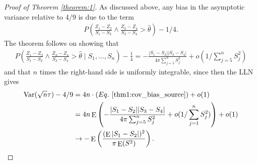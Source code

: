 \documentclass[12pt]{article}
\renewcommand{\P}{P}
\newcommand{\z}{Z}
\newcommand{\s}{S}
\newcommand{\thetahat}{\hat{\theta}}
\DeclareMathOperator{\E}{E}
\DeclareMathOperator{\V}{Var}
\DeclareMathOperator{\Cov}{Cov}
\newcommand{\comment}[1]{
  \iftoggle{commenttoggle}{
    {\normalsize{\color{red}{ #1}}\normalsize}
  }
  {}
}
\begin{document}
\begin{proof}[Proof of Theorem \ref{theorem:1}]
   As discussed above, any bias in the asymptotic variance relative to 4/9 is due to the term %
    \begin{align}
      \P\left(\frac{\z_1-\z_2}{\s_1-\s_2}\wedge \frac{\z_3-\z_4}{\s_3-\s_4}>\thetahat\right) - 1/4.
      \label{thm1:cov_bias_source}
    \end{align}
    The theorem follows on showing that %
    \begin{align}
      \P\left(\frac{\z_1-\z_2}{\s_1-\s_2}\wedge \frac{\z_3-\z_4}{\s_3-\s_4}>\thetahat\mid \s_1,\ldots,\s_n\right)-\frac{1}{4}
      = -\frac{|\s_1-\s_2||\s_3-\s_4|}{4\pi\sum_{j=5}^n \s_j^2} + o(1/\sum_{j=5}^n \s_j^2)
    \end{align}
    and that $n$ times the right-hand side is uniformly integrable, since then the LLN gives
    \begin{align}
      \begin{split}
      \V(\sqrt{n}\tau) - 4/9 &= 4n \cdot (Eq.\hspace{.05in} \eqref{thm1:cov_bias_source}) + o(1)\\
                               &= 4n\E\left( -\frac{|\s_1-\s_2||\s_3-\s_4|}{4\pi\sum_{j=5}^n \s_j^2} + o(1/\sum_{j=1}^n \s_j^2) \right) + o(1)\\
                               &\to -\E\left(\frac{(\E|\s_1-\s_2|)^2}{\pi\E(\s^2)}\right).
                             \end{split}\label{thm1:conclusion}
    \end{align}
    

\end{proof}
\end{document}
